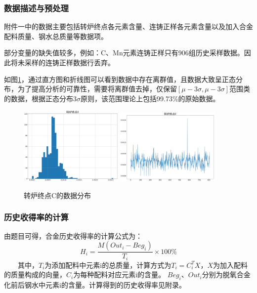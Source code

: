 \documentclass{xcumcmart}
\begin{document}
\subsubsection{数据描述与预处理}
\par 附件一中的数据主要包括转炉终点各元素含量、连铸正样各元素含量以及加入合金配料质量、钢水总质量等数据项。
\par 部分变量的缺失值较多，例如：C、Mn元素连铸正样只有906组历史采样数据。因此将未采样的连铸正样数据行丢弃。
\par 如图\ref{fig:prev}，通过直方图和折线图可以看到数据中存在离群值，且数据大致呈正态分布，为了提高分析的可靠性，需要将离群值去掉，仅保留$[\mu-3\sigma,\mu-3\sigma]$范围类的数据，根据正态分布3$\sigma$原则，该范围理论上包括99.73\%的原始数据。
\begin{figure}[htbp]
	\centering
	\includegraphics[width=0.45\textwidth]{fig/hist.png}
	\includegraphics[width=0.45\textwidth]{fig/index.png}
	\caption{转炉终点C的数据分布\label{fig:prev}}
\end{figure}
\subsubsection{历史收得率的计算}
由题目可得，合金历史收得率的计算公式为：
\begin{equation} \label{eq:eps1}
    H_i=\frac{M(Out_i-Beg_i)}{T_i}\times 100\%
\end{equation}
　　其中，$T_i$为添加配料中元素i的总质量，计算方式为$T_i=C_{i}^{T}X$，$X$为加入配料的质量构成的向量，$C_i$为每种配料对应元素i的含量。
$Beg_i$、$Out_i$分别为脱氧合金化前后钢水中元素i的含量。计算得到的历史收得率见附录。
\end{document}
